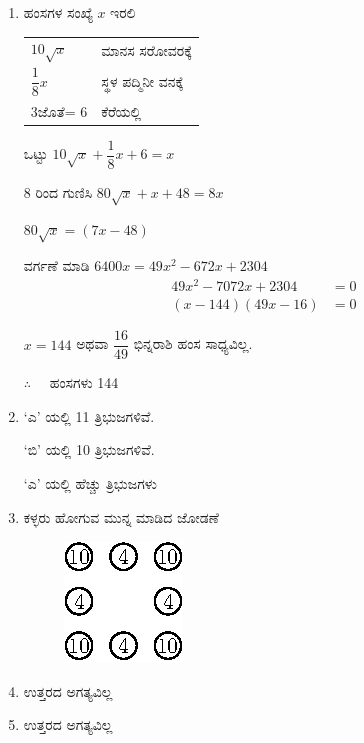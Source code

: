 \begin{enumerate}
\item ಹಂಸಗಳ ಸಂಖ್ಯೆ $x$ ಇರಲಿ 

\begin{tabular}[t]{ll}
$10 \sqrt{x}$ & ಮಾನಸ ಸರೋವರಕ್ಕೆ \\
$\dfrac{1}{8} x$ & ಸ್ಥಳ ಪದ್ಮಿನೀ ವನಕ್ಕೆ \\
$3$ಜೊತೆ= $6$ & ಕೆರೆಯಲ್ಲಿ\\
\end{tabular}

ಒಟ್ಟು $10\sqrt{x} + \dfrac{1}{8}x + 6 = x$

8 ರಿಂದ ಗುಣಿಸಿ $80\sqrt{x} + x + 48 = 8x$

$80\sqrt{x} = (7x - 48)$

ವರ್ಗಣೆ ಮಾಡಿ $6400x = 49x^{2} - 672x + 2304$
\begin{align*}
49x^{2} - 7072x + 2304 & = 0\\
(x - 144) (49x - 16) & = 0
\end{align*}
 
 $x = 144$ ಅಥವಾ $\dfrac{16}{49}$ ಭಿನ್ನರಾಶಿ ಹಂಸ ಸಾಧ್ಯವಿಲ್ಲ. 
 
 $\therefore\quad$ ಹಂಸಗಳು 144

\item `ಎ' ಯಲ್ಲಿ 11 ತ್ರಿಭುಜಗಳಿವೆ. 

`ಬಿ' ಯಲ್ಲಿ 10 ತ್ರಿಭುಜಗಳಿವೆ. 

`ಎ' ಯಲ್ಲಿ ಹೆಚ್ಚು ತ್ರಿಭುಜಗಳು 

\item ಕಳ್ಳರು ಹೋಗುವ ಮುನ್ನ ಮಾಡಿದ ಜೋಡಣೆ 
\begin{figure}[H]
\centering
\includegraphics{images/chap12/ans28.eps}

\hspace{3cm}
\end{figure} 



\item ಉತ್ತರದ ಅಗತ್ಯವಿಲ್ಲ 

\item ಉತ್ತರದ ಅಗತ್ಯವಿಲ್ಲ 
\end{enumerate}
